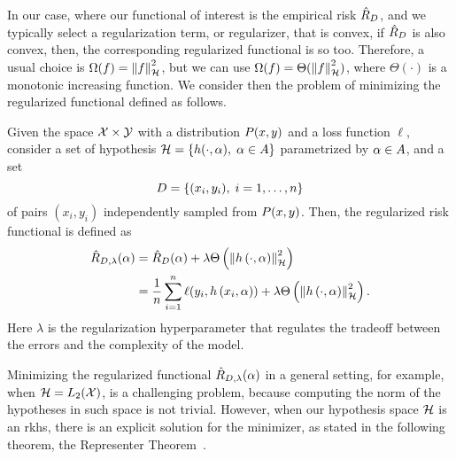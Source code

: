 In our case, where our functional of interest is the empirical risk $\hat{R}_{D}$, and we typically select a regularization term, or regularizer, that is convex, if $\hat{R}_{D}$ is also convex, then, the corresponding regularized functional is so too. Therefore, a usual choice is $\Omega(f) = \left\lVert f\right\rVert^2_{\mathcal{H}}$, but we can use $\Omega(f) = \Theta(\left\lVert f\right\rVert_{\mathcal{H}}^2)$, where $\Theta(\cdot)$ is a monotonic increasing function.
We consider then the problem of minimizing the regularized functional defined as follows.
\begin{definition}
    Given the space $\mathcal{X} \times \mathcal{Y}$ with a distribution $P(x, y)$ and a loss function $\ell$, consider a set of hypothesis $\mathcal{H} = \left\{h(\cdot, \alpha),\; \alpha \in A\right\}$ parametrized by $\alpha \in A$, and a set 
    \begin{equation}
        \nonumber
        D = \left\{(x_i, y_i), \; i=1, \ldots, n\right\} 
    \end{equation}
    of pairs $(x_i, y_i)$ independently sampled from $P(x, y)$.   
    Then, the regularized risk functional is defined as
    \begin{equation}
        \label{eq:regrisk_def}
        \begin{aligned}
            \regrisk(\param) &= \emprisk(\param) + \lambda \Theta\left(\norm{\hyp{\cdot}{\param}}^2_\hypspace \right) \\
            &= \frac{1}{\nsamples} \sum_{i=1}^\nsamples \ell(y_i, \hyp{x_i}{\param}) + \lambda \Theta\left(\norm{\hyp{\cdot}{\param}}^2_\hypspace \right) .
        \end{aligned}        
    \end{equation}
    Here $\lambda$ is the regularization hyperparameter that regulates the tradeoff between the errors and the complexity of the model.
\end{definition}
%
Minimizing the regularized functional $\hat{R}_{D, \lambda}(\alpha)$ in a general setting, for example, when $\mathcal{H} = L_2(\mathcal{X})$, is a challenging problem, because computing the norm of the hypotheses in such space is not trivial.
%
However, when our hypothesis space $\mathcal{H}$ is an \acrshort{rkhs}, there is an explicit solution for the minimizer, as stated in the following theorem, the Representer Theorem~\citep{ScholkopfHS01}.

